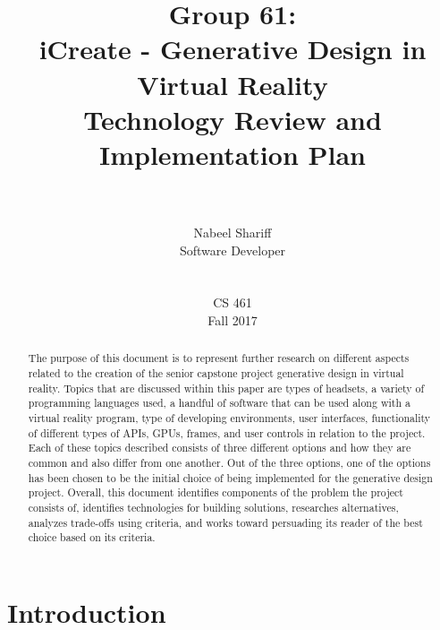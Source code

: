 \documentclass[letterpaper,10pt,onecolumn,compsoc]{IEEEtran}
\title{~ \\ ~ \\ ~ \\ ~ \\ ~ \\Group 61:\\iCreate - Generative Design in Virtual Reality\\Technology Review and Implementation Plan\\ ~ \\}
\author{\leavevmode\rlap{Rhea Mae Edwards}\hfill{Nabeel Shariff}\hfill\llap{Hannah Solorzano}\\\leavevmode\rlap{Software Developer}\hfill{Software Developer}\hfill\llap{Software Developer}\\ ~ \\ ~ \\CS 461\\Fall 2017}
\begin{document}
\maketitle

\begin{abstract}


\noindent
The purpose of this document is to represent further research on different aspects related to the creation of the senior capstone project generative design in virtual reality. Topics that are discussed within this paper are types of headsets, a variety of programming languages used, a handful of software that can be used along with a virtual reality program, type of developing environments, user interfaces, functionality of different types of APIs, GPUs, frames, and user controls in relation to the project. Each of these topics described consists of three different options and how they are common and also differ from one another. Out of the three options, one of the options has been chosen to be the initial choice of being implemented for the generative design project. Overall, this document identifies components of the problem the project consists of, identifies technologies for building solutions, researches alternatives, analyzes trade-offs using criteria, and works toward persuading its reader of the best choice based on its criteria.

\end{abstract}

\newpage


\tableofcontents

\newpage

\section{Introduction}
\end{document}
